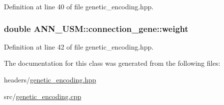 Definition at line 40 of file genetic\-\_\-encoding.\-hpp.

\hypertarget{class_a_n_n___u_s_m_1_1connection__gene_a12dddd6cd3c0c5b9749015cc1c81e480}{
\subsubsection[{weight}]{\setlength{\rightskip}{0pt plus 5cm}double A\-N\-N\-\_\-\-U\-S\-M\-::connection\-\_\-gene\-::weight}}\label{class_a_n_n___u_s_m_1_1connection__gene_a12dddd6cd3c0c5b9749015cc1c81e480}


Definition at line 42 of file genetic\-\_\-encoding.\-hpp.



The documentation for this class was generated from the following files\-:\begin{DoxyCompactItemize}
\item 
headers/\hyperlink{genetic__encoding_8hpp}{genetic\-\_\-encoding.\-hpp}\item 
src/\hyperlink{genetic__encoding_8cpp}{genetic\-\_\-encoding.\-cpp}\end{DoxyCompactItemize}

